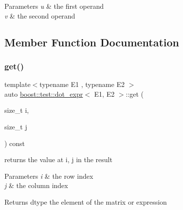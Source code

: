 \begin{DoxyParams}{Parameters}
{\em u} & the first operand \\
\hline
{\em v} & the second operand \\
\hline
\end{DoxyParams}


\subsection{Member Function Documentation}
\mbox{\label{classboost_1_1test_1_1dot__expr_a9de7f85545afb34236cfc49f02a409ef}} 
\subsubsection{\texorpdfstring{get()}{get()}}
{\footnotesize\ttfamily template$<$typename E1 , typename E2 $>$ \\
auto \mbox{\hyperlink{classboost_1_1test_1_1dot__expr}{boost\+::test\+::dot\+\_\+expr}}$<$ E1, E2 $>$\+::get (\begin{DoxyParamCaption}\item[{size\+\_\+t}]{i,  }\item[{size\+\_\+t}]{j }\end{DoxyParamCaption}) const\hspace{0.3cm}{\ttfamily [inline]}}



returns the value at i, j in the result 


\begin{DoxyParams}{Parameters}
{\em i} & the row index \\
\hline
{\em j} & the column index \\
\hline
\end{DoxyParams}
\begin{DoxyReturn}{Returns}
dtype the element of the matrix or expression 
\end{DoxyReturn}
\mbox{\label{classboost_1_1test_1_1dot__expr_aba6c384283170bee5109d9067db15423}} 

